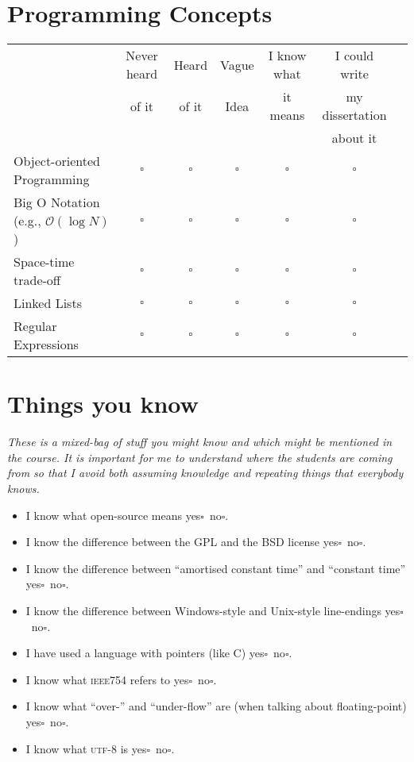 \documentclass[article,twoside]{memoir}
\newcommand*{\bigO}{\mathcal{O}}
\newcommand*{\checkbox}{$\square$}
\newcommand*{\yesno}{\hfill\mbox{yes\checkbox~no\checkbox}}
\newcommand{\header}[1]{\textsl{#1}}
\begin{document}
\section{Programming Concepts}
\begin{tabular}{lcccccc}
 \toprule
 & Never heard  & Heard & Vague & I know what & I could write    \\
 & of it        & of it & Idea  & it means    & my dissertation  \\
 &              &       &       &             &    about it      \\
 \midrule
Object-oriented Programming            &\checkbox &\checkbox &\checkbox &\checkbox &\checkbox \\
Big O Notation (e.g., $\bigO(\log N)$) &\checkbox &\checkbox &\checkbox &\checkbox &\checkbox \\
Space-time trade-off                   &\checkbox &\checkbox &\checkbox &\checkbox &\checkbox \\
Linked Lists                           &\checkbox &\checkbox &\checkbox &\checkbox &\checkbox \\
Regular Expressions                    &\checkbox &\checkbox &\checkbox &\checkbox &\checkbox \\
\end{tabular}


\section{Things you know}
\header{These is a mixed-bag of stuff you might know and which might be mentioned in the course. It is important for me to understand where the students are coming from so that I avoid both assuming knowledge and repeating things that everybody knows.}

\begin{itemize}
\item I know what open-source means \yesno.
\item I know the difference between the GPL and the BSD license \yesno.
\item I know the difference between ``amortised constant time'' and ``constant time'' \yesno.
\item I know the difference between Windows-style and Unix-style line-endings \yesno.
\item I have used a language with pointers (like C) \yesno.
\item I know what \textsc{ieee754} refers to \yesno.
\item I know what ``over-'' and ``under-flow'' are (when talking about floating-point) \yesno.
\item I know what \textsc{utf-8} is \yesno.
\end{itemize}
\end{document}
